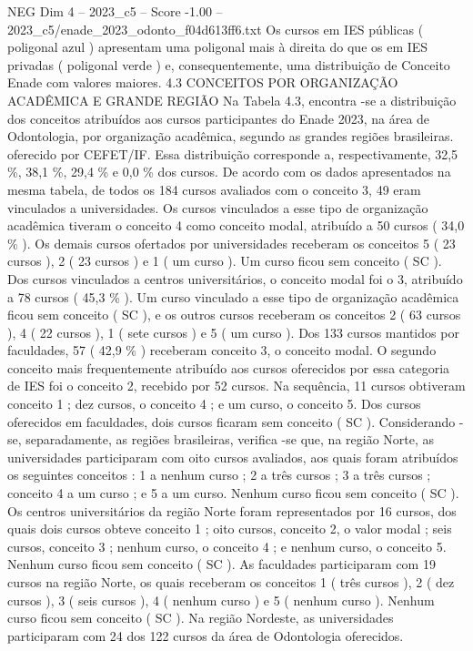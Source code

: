 \begin{textsample}{NEG Dim 4 – 2023\_c5 – Score -1.00 – 2023\_c5/enade\_2023\_odonto\_f04d613ff6.txt}
Os cursos em IES públicas ( poligonal azul ) apresentam uma poligonal mais à direita do que os em IES privadas ( poligonal verde ) e, consequentemente, uma distribuição de Conceito Enade com valores maiores. 4.3 CONCEITOS POR ORGANIZAÇÃO ACADÊMICA E GRANDE REGIÃO Na Tabela 4.3, encontra -se a distribuição dos conceitos atribuídos aos cursos participantes do Enade 2023, na área de Odontologia, por organização acadêmica, segundo as grandes regiões brasileiras. oferecido por CEFET/IF.
Essa distribuição corresponde a, respectivamente, 32,5 \%, 38,1 \%, 29,4 \% e 0,0 \% dos cursos.
De acordo com os dados apresentados na mesma tabela, de todos os 184 cursos avaliados com o conceito 3, 49 eram vinculados a universidades.
Os cursos vinculados a esse tipo de organização acadêmica tiveram o conceito 4 como conceito modal, atribuído a 50 cursos ( 34,0 \% ).
Os demais cursos ofertados por universidades receberam os conceitos 5 ( 23 cursos ), 2 ( 23 cursos ) e 1 ( um curso ).
Um curso ficou sem conceito ( SC ).
Dos cursos vinculados a centros universitários, o conceito modal foi o 3, atribuído a 78 cursos ( 45,3 \% ).
Um curso vinculado a esse tipo de organização acadêmica ficou sem conceito ( SC ), e os outros cursos receberam os conceitos 2 ( 63 cursos ), 4 ( 22 cursos ), 1 ( sete cursos ) e 5 ( um curso ).
Dos 133 cursos mantidos por faculdades, 57 ( 42,9 \% ) receberam conceito 3, o conceito modal.
O segundo conceito mais frequentemente atribuído aos cursos oferecidos por essa categoria de IES foi o conceito 2, recebido por 52 cursos.
Na sequência, 11 cursos obtiveram conceito 1 ; dez cursos, o conceito 4 ; e um curso, o conceito 5.
Dos cursos oferecidos em faculdades, dois cursos ficaram sem conceito ( SC ).
Considerando -se, separadamente, as regiões brasileiras, verifica -se que, na região Norte, as universidades participaram com oito cursos avaliados, aos quais foram atribuídos os seguintes conceitos : 1 a nenhum curso ; 2 a três cursos ; 3 a três cursos ; conceito 4 a um curso ; e 5 a um curso.
Nenhum curso ficou sem conceito ( SC ).
Os centros universitários da região Norte foram representados por 16 cursos, dos quais dois cursos obteve conceito 1 ; oito cursos, conceito 2, o valor modal ; seis cursos, conceito 3 ; nenhum curso, o conceito 4 ; e nenhum curso, o conceito 5.
Nenhum curso ficou sem conceito ( SC ).
As faculdades participaram com 19 cursos na região Norte, os quais receberam os conceitos 1 ( três cursos ), 2 ( dez cursos ), 3 ( seis cursos ), 4 ( nenhum curso ) e 5 ( nenhum curso ).
Nenhum curso ficou sem conceito ( SC ).
Na região Nordeste, as universidades participaram com 24 dos 122 cursos da área de Odontologia oferecidos.

\end{textsample}

